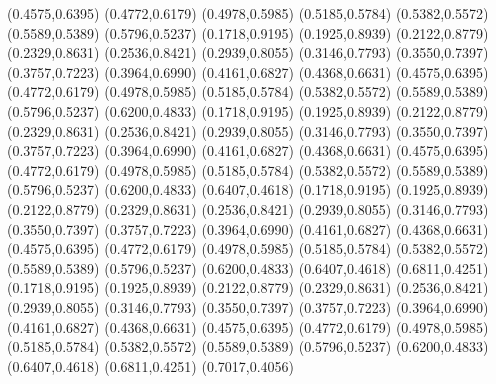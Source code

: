 \PST@Diamond(0.4575,0.6395)
\PST@Diamond(0.4772,0.6179)
\PST@Diamond(0.4978,0.5985)
\PST@Diamond(0.5185,0.5784)
\PST@Diamond(0.5382,0.5572)
\PST@Diamond(0.5589,0.5389)
\PST@Diamond(0.5796,0.5237)
\PST@Diamond(0.1718,0.9195)
\PST@Diamond(0.1925,0.8939)
\PST@Diamond(0.2122,0.8779)
\PST@Diamond(0.2329,0.8631)
\PST@Diamond(0.2536,0.8421)
\PST@Diamond(0.2939,0.8055)
\PST@Diamond(0.3146,0.7793)
\PST@Diamond(0.3550,0.7397)
\PST@Diamond(0.3757,0.7223)
\PST@Diamond(0.3964,0.6990)
\PST@Diamond(0.4161,0.6827)
\PST@Diamond(0.4368,0.6631)
\PST@Diamond(0.4575,0.6395)
\PST@Diamond(0.4772,0.6179)
\PST@Diamond(0.4978,0.5985)
\PST@Diamond(0.5185,0.5784)
\PST@Diamond(0.5382,0.5572)
\PST@Diamond(0.5589,0.5389)
\PST@Diamond(0.5796,0.5237)
\PST@Diamond(0.6200,0.4833)
\PST@Diamond(0.1718,0.9195)
\PST@Diamond(0.1925,0.8939)
\PST@Diamond(0.2122,0.8779)
\PST@Diamond(0.2329,0.8631)
\PST@Diamond(0.2536,0.8421)
\PST@Diamond(0.2939,0.8055)
\PST@Diamond(0.3146,0.7793)
\PST@Diamond(0.3550,0.7397)
\PST@Diamond(0.3757,0.7223)
\PST@Diamond(0.3964,0.6990)
\PST@Diamond(0.4161,0.6827)
\PST@Diamond(0.4368,0.6631)
\PST@Diamond(0.4575,0.6395)
\PST@Diamond(0.4772,0.6179)
\PST@Diamond(0.4978,0.5985)
\PST@Diamond(0.5185,0.5784)
\PST@Diamond(0.5382,0.5572)
\PST@Diamond(0.5589,0.5389)
\PST@Diamond(0.5796,0.5237)
\PST@Diamond(0.6200,0.4833)
\PST@Diamond(0.6407,0.4618)
\PST@Diamond(0.1718,0.9195)
\PST@Diamond(0.1925,0.8939)
\PST@Diamond(0.2122,0.8779)
\PST@Diamond(0.2329,0.8631)
\PST@Diamond(0.2536,0.8421)
\PST@Diamond(0.2939,0.8055)
\PST@Diamond(0.3146,0.7793)
\PST@Diamond(0.3550,0.7397)
\PST@Diamond(0.3757,0.7223)
\PST@Diamond(0.3964,0.6990)
\PST@Diamond(0.4161,0.6827)
\PST@Diamond(0.4368,0.6631)
\PST@Diamond(0.4575,0.6395)
\PST@Diamond(0.4772,0.6179)
\PST@Diamond(0.4978,0.5985)
\PST@Diamond(0.5185,0.5784)
\PST@Diamond(0.5382,0.5572)
\PST@Diamond(0.5589,0.5389)
\PST@Diamond(0.5796,0.5237)
\PST@Diamond(0.6200,0.4833)
\PST@Diamond(0.6407,0.4618)
\PST@Diamond(0.6811,0.4251)
\PST@Diamond(0.1718,0.9195)
\PST@Diamond(0.1925,0.8939)
\PST@Diamond(0.2122,0.8779)
\PST@Diamond(0.2329,0.8631)
\PST@Diamond(0.2536,0.8421)
\PST@Diamond(0.2939,0.8055)
\PST@Diamond(0.3146,0.7793)
\PST@Diamond(0.3550,0.7397)
\PST@Diamond(0.3757,0.7223)
\PST@Diamond(0.3964,0.6990)
\PST@Diamond(0.4161,0.6827)
\PST@Diamond(0.4368,0.6631)
\PST@Diamond(0.4575,0.6395)
\PST@Diamond(0.4772,0.6179)
\PST@Diamond(0.4978,0.5985)
\PST@Diamond(0.5185,0.5784)
\PST@Diamond(0.5382,0.5572)
\PST@Diamond(0.5589,0.5389)
\PST@Diamond(0.5796,0.5237)
\PST@Diamond(0.6200,0.4833)
\PST@Diamond(0.6407,0.4618)
\PST@Diamond(0.6811,0.4251)
\PST@Diamond(0.7017,0.4056)
